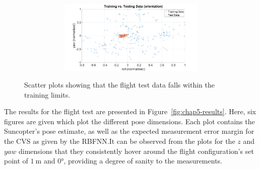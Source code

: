 \begin{figure}
\begin{subfigure}{\textwidth}
\begin{subfigure}{0.48\textwidth}
    \end{subfigure}
    \begin{subfigure}{0.48\textwidth}
      \includegraphics[clip, trim = 80 0 100 0, width=\textwidth]{figures/chapter5/tr_v_ts_rollyaw}
    \end{subfigure}
    \caption{}
  \end{subfigure}
  \caption[Scatter plots of flight data vs.\ training data. ]{Scatter plots showing that the flight test data falls within the training limits. }
\label{fig:chap5-ts-tr-scatter}
\end{figure}

The results for the flight test are presented in Figure~\ref{fig:chap5-results}. Here, six figures are given which plot the different pose dimensions. Each plot contains the Suncopter's pose estimate, as well as the expected measurement error margin for the CVS as given by the RBFNN.\@ It can be observed from the plots for the $z$ and $yaw$ dimensions that they consistently hover around the flight configuration's set point of $\SI{1}{\m}$ and $\ang{0}$, providing a degree of sanity to the measurements. 
  
